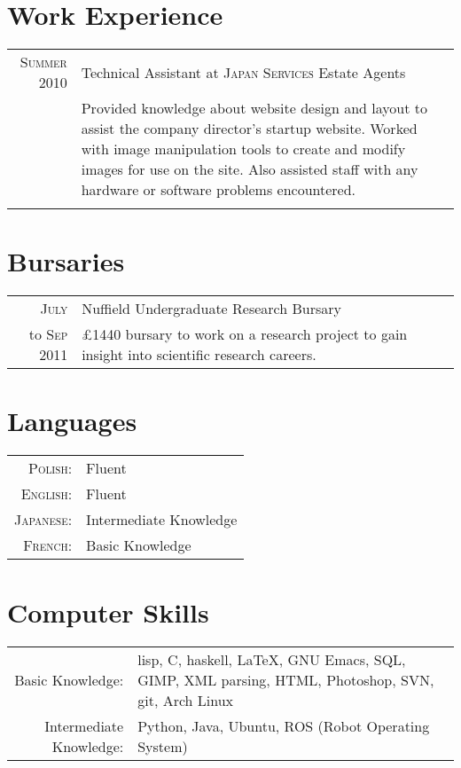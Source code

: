 \documentclass[a4paper,10pt]{article}
\begin{document}
\section{Work Experience}
\begin{tabular}{r|p{11cm}}
  \textsc{Summer 2010}& Technical Assistant at \textsc{Japan Services} Estate Agents\\
  &\footnotesize{Provided knowledge about website design and layout to assist the company director's startup website. Worked with image manipulation tools to create and modify images for use on the site. Also assisted staff with any hardware or software problems encountered.}\\\multicolumn{2}{c}{} \\
\end{tabular}

\section{Bursaries}
\begin{tabular}{r|p{11cm}}
  \textsc{July} & Nuffield Undergraduate Research Bursary\\
  to \textsc{Sep 2011}&\footnotesize{£1440 bursary to work on a research project to gain insight into scientific research careers.}
\end{tabular}

\section{Languages}
\begin{tabular}{rl}
  \textsc{Polish:}&Fluent\\
  \textsc{English:}&Fluent\\
  \textsc{Japanese:}&Intermediate Knowledge\\
  \textsc{French:}&Basic Knowledge\\
\end{tabular}

\section{Computer Skills}
\begin{tabular}{rp{9cm}}
  Basic Knowledge:& lisp, C, haskell, \LaTeX, GNU Emacs, SQL, GIMP, XML parsing, HTML, Photoshop, SVN, git, Arch Linux\\
  Intermediate Knowledge:& Python, Java, Ubuntu, ROS (Robot Operating System)\\
\end{tabular}
\end{document}
